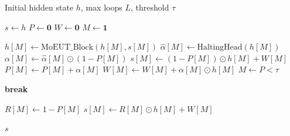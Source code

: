 \documentclass[11pt]{article}
\begin{document}
\begin{algorithm}[htbp]
\small
\caption{Adaptive Halting and State Update Mechanism}
\label{alg:adaptive_halting}
\begin{algorithmic}[1]
    \Require Initial hidden state $h$, max loops $L$, threshold $\tau$
    
    \State $s \gets h$
    \State $P \gets \mathbf{0}$ 
    \State $W \gets \mathbf{0}$ 
    \State $M \gets \mathbf{1}$ 
    
        \State $h[M] \gets \text{MoEUT\_Block}(h[M], s[M])$
        \State $\hat{\alpha}[M] \gets \text{HaltingHead}(h[M])$
        \State $\alpha[M] \gets \hat{\alpha}[M] \odot (1 - P[M])$
        \State $s[M] \gets (1 - P[M]) \odot h[M] + W[M]$
        \State $P[M] \gets P[M] + \alpha[M]$
        \State $W[M] \gets W[M] + \alpha[M] \odot h[M]$
        \State $M \gets P < \tau$

            \State \textbf{break}
        \EndIf
    \EndFor
    
        \State $R[M] \gets 1 - P[M]$ 
        \State $s[M] \gets R[M] \odot h[M] + W[M]$
    \EndIf
    
    \State \Return $s$
\end{algorithmic}
\end{algorithm}
\end{document}
